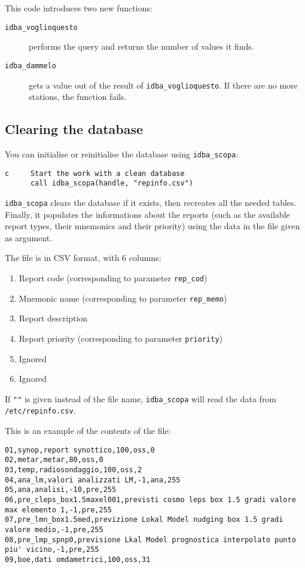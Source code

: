\documentclass[final,12pt,a4paper,twoside]{book}
\begin{document}
This code introduces two new functions:

\begin{description}
\item[{\tt idba\_voglioquesto}]
  performs the query and returns the number of values it finds.
\item[{\tt idba\_dammelo}]
  gets a value out of the result of {\tt idba\_voglioquesto}.  If there are no
  more stations, the function fails.
\end{description}

\subsection {Clearing the database}

You can initialise or reinitialise the database using {\tt idba\_scopa}:
\label{fun-idba_scopa}

\begin{verbatim}
c     Start the work with a clean database
      call idba_scopa(handle, "repinfo.csv")
\end{verbatim}

{\tt idba\_scopa} clears the database if it exists, then recreates all the
needed tables.  Finally, it populates the informations about the reports (such
as the available report types, their mnemonics and their priority) using the
data in the file given as argument.

The file is in CSV format, with 6 columns:
\begin{enumerate}
\item Report code (corresponding to parameter {\tt rep\_cod})
\item Mnemonic name (corresponding to parameter {\tt rep\_memo})
\item Report description
\item Report priority (corresponding to parameter {\tt priority})
\item Ignored
\item Ignored
\end{enumerate}

If {\tt ""} is given instead of the file name, {\tt idba\_scopa} will read the
data from {\tt /etc/repinfo.csv}.

This is an example of the contents of the file:

\begin{verbatim}
01,synop,report synottico,100,oss,0
02,metar,metar,80,oss,0
03,temp,radiosondaggio,100,oss,2
04,ana_lm,valori analizzati LM,-1,ana,255
05,ana,analisi,-10,pre,255
06,pre_cleps_box1.5maxel001,previsti cosmo leps box 1.5 gradi valore max elemento 1,-1,pre,255
07,pre_lmn_box1.5med,previzione Lokal Model nudging box 1.5 gradi valore medio,-1,pre,255
08,pre_lmp_spnp0,previsione Lkal Model prognostica interpolato punto piu' vicino,-1,pre,255
09,boe,dati omdametrici,100,oss,31
\end{verbatim}
\end{document}
